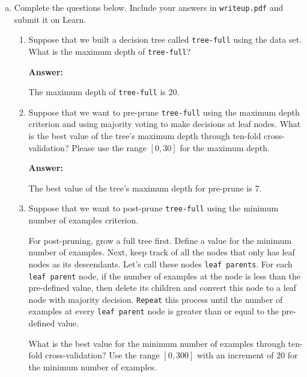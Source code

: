 \documentclass[12pt]{article}
\begin{document}
\begin{enumerate}[(a)]
\item 
Complete the questions below. Include your answers in \verb+writeup.pdf+ and submit it on Learn.

\begin{enumerate}[(1)]
\item 
Suppose that we built a decision tree called \verb+tree-full+ using the data set. What is the maximum depth of \verb+tree-full+? 

{\bf Answer:}

The maximum depth of \verb+tree-full+ is 20.

\item 
Suppose that we want to pre-prune \verb+tree-full+ using the maximum depth criterion and using majority voting to make decisions at leaf nodes. What is the best value of the tree's maximum depth through ten-fold cross-validation? Please use the range $[0, 30]$ for the maximum depth.

{\bf Answer:}

The best value of the tree's maximum depth for pre-prune is 7.

\item 
Suppose that we want to post-prune \verb+tree-full+ using the minimum number of examples criterion.

For post-pruning, grow a full tree first. Define a value for the minimum number of examples. Next, keep track of all the nodes that only has leaf nodes as its descendants. Let's call these nodes \verb+leaf parents+. For each \verb+leaf parent+ node, if the number of examples at the node is less than the pre-defined value, then delete its children and convert this node to a leaf node with majority decision. \verb+Repeat+ this process until the number of examples at every \verb+leaf parent+ node is greater than or equal to the pre-defined value.

What is the best value for the minimum number of examples  through ten-fold cross-validation? Use the range $[0, 300]$ with an increment of $20$ for the minimum number of examples.


\end{enumerate}
\end{enumerate}
\end{document}
